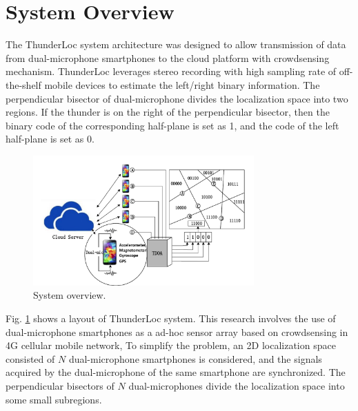 \section{System Overview}


 The ThunderLoc system architecture was designed to allow transmission of data from dual-microphone smartphones to the cloud platform with crowdsensing mechanism.
 ThunderLoc leverages stereo recording with high sampling rate of off-the-shelf mobile devices to estimate the left/right binary information.
 The perpendicular bisector of dual-microphone divides the localization space into two regions.
 If the thunder is on the right of the perpendicular bisector, then the binary code of the corresponding half-plane is set as 1, 
 and the code of the left half-plane is set as 0.


  \begin{figure}[htb]
            \setlength{\abovecaptionskip}{0pt}
            \centering
            \includegraphics[scale=2,height=5.0cm]{fig/overview.pdf}
			 \vspace{1mm}
            \caption{\label{overview}System overview.}
			 \label{overview}
            \vspace{-4mm}
  \end{figure}
  
 Fig. \ref{overview} shows a layout of ThunderLoc system.  
 This research involves the use of dual-microphone smartphones as a ad-hoc sensor array based on crowdsensing in 4G cellular mobile network,
  To simplify the problem, an 2D localization space consisted of $N$ dual-microphone smartphones is considered,
 and the signals acquired by the dual-microphone of the same smartphone are synchronized.
 The perpendicular bisectors of  $N$ dual-microphones divide the localization space into some small subregions.
 
